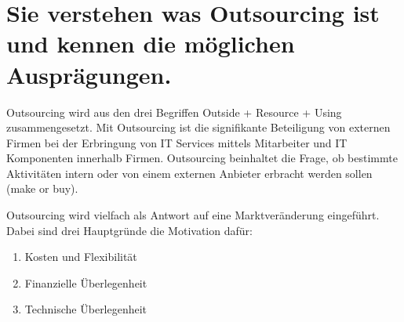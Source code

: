 \section{Sie verstehen was Outsourcing ist und kennen die möglichen Ausprägungen.}

Outsourcing wird aus den drei Begriffen Outside + Resource + Using zusammengesetzt. Mit Outsourcing ist die signifikante Beteiligung von externen Firmen bei der Erbringung von IT Services mittels Mitarbeiter und IT Komponenten innerhalb Firmen. Outsourcing beinhaltet die Frage, ob bestimmte Aktivitäten intern oder von einem externen Anbieter erbracht werden sollen (make or buy).

Outsourcing wird vielfach als Antwort auf eine Marktveränderung eingeführt. Dabei sind drei Hauptgründe die Motivation dafür:
\begin{enumerate}
	\item Kosten und Flexibilität
	\item Finanzielle Überlegenheit
	\item Technische Überlegenheit
\end{enumerate}

